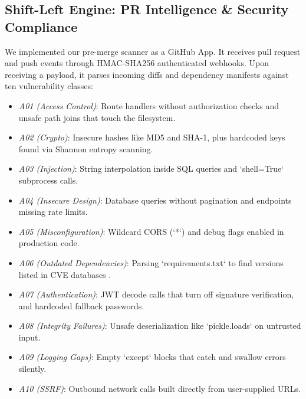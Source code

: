 \documentclass[10pt,conference]{IEEEtran}
\begin{document}
\subsection{Shift-Left Engine: PR Intelligence \& Security Compliance}

We implemented our pre-merge scanner as a GitHub App. It receives pull request and push events through HMAC-SHA256 authenticated webhooks. Upon receiving a payload, it parses incoming diffs and dependency manifests against ten vulnerability classes:
\begin{itemize}
\item \textit{A01 (Access Control)}: Route handlers without authorization checks and unsafe path joins that touch the filesystem.
\item \textit{A02 (Crypto)}: Insecure hashes like MD5 and SHA-1, plus hardcoded keys found via Shannon entropy scanning.
\item \textit{A03 (Injection)}: String interpolation inside SQL queries and `shell=True` subprocess calls.
\item \textit{A04 (Insecure Design)}: Database queries without pagination and endpoints missing rate limits.
\item \textit{A05 (Misconfiguration)}: Wildcard CORS (`*`) and debug flags enabled in production code.
\item \textit{A06 (Outdated Dependencies)}: Parsing `requirements.txt` to find versions listed in CVE databases \cite{cve}.
\item \textit{A07 (Authentication)}: JWT decode calls that turn off signature verification, and hardcoded fallback passwords.
\item \textit{A08 (Integrity Failures)}: Unsafe deserialization like `pickle.loads` on untrusted input.
\item \textit{A09 (Logging Gaps)}: Empty `except` blocks that catch and swallow errors silently.
\item \textit{A10 (SSRF)}: Outbound network calls built directly from user-supplied URLs.
\end{itemize}
\end{document}
